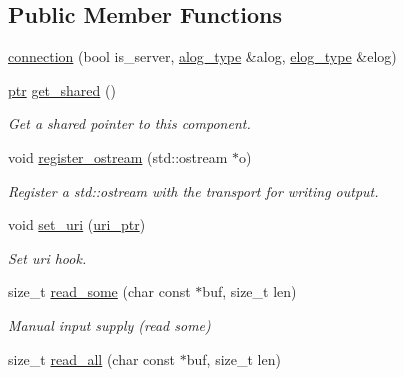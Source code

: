 \subsection*{Public Member Functions}
\begin{DoxyCompactItemize}
\item 
\hyperlink{classwebsocketpp_1_1transport_1_1iostream_1_1connection_a737fcfe26dfda316d9908b819d3580b0}{connection} (bool is\+\_\+server, \hyperlink{classwebsocketpp_1_1transport_1_1iostream_1_1connection_a0bd2807136340e5af69325f3163fb79b}{alog\+\_\+type} \&alog, \hyperlink{classwebsocketpp_1_1transport_1_1iostream_1_1connection_a3d5acbd564bf27265665f243b80fc251}{elog\+\_\+type} \&elog)
\item 
\hyperlink{classwebsocketpp_1_1transport_1_1iostream_1_1connection_a054436e87f6dc4404b13f6131707d2ab}{ptr} \hyperlink{classwebsocketpp_1_1transport_1_1iostream_1_1connection_afab9454b5af00a8edb494fdd2e32a41e}{get\+\_\+shared} ()
\begin{DoxyCompactList}\small\item\em Get a shared pointer to this component. \end{DoxyCompactList}\item 
void \hyperlink{classwebsocketpp_1_1transport_1_1iostream_1_1connection_ad0d1f64845818bb6bebe43fe057e4da2}{register\+\_\+ostream} (std\+::ostream $\ast$o)
\begin{DoxyCompactList}\small\item\em Register a std\+::ostream with the transport for writing output. \end{DoxyCompactList}\item 
void \hyperlink{classwebsocketpp_1_1transport_1_1iostream_1_1connection_a0f5d21e86961b0f3d75c417d5f45d4ac}{set\+\_\+uri} (\hyperlink{namespacewebsocketpp_aae370ea5ac83a8ece7712cb39fc23f5b}{uri\+\_\+ptr})
\begin{DoxyCompactList}\small\item\em Set uri hook. \end{DoxyCompactList}\item 
size\+\_\+t \hyperlink{classwebsocketpp_1_1transport_1_1iostream_1_1connection_a4616555cbee050aec84da1e39a3c34a8}{read\+\_\+some} (char const $\ast$buf, size\+\_\+t len)
\begin{DoxyCompactList}\small\item\em Manual input supply (read some) \end{DoxyCompactList}\item 
size\+\_\+t \hyperlink{classwebsocketpp_1_1transport_1_1iostream_1_1connection_a4a492425587bf02f557d8f03b8be8dc8}{read\+\_\+all} (char const $\ast$buf, size\+\_\+t len)

\end{DoxyCompactItemize}

